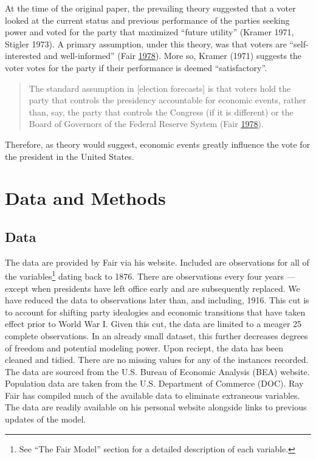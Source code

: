 \documentclass[11,]{article}
\let\rmarkdownfootnote\footnote%
\def\footnote{\protect\rmarkdownfootnote}
\begin{document}
At the time of the original paper, the prevailing theory suggested that
a voter looked at the current status and previous performance of the
parties seeking power and voted for the party that maximized ``future
utility'' (Kramer 1971, Stigler 1973). A primary assumption, under this
theory, was that voters are ``self-interested and well-informed'' (Fair
\protect\hyperlink{ref-fair_effect_1978}{1978}). More so, Kramer (1971)
suggests the voter votes for the party if their performance is deemed
``satisfactory''.

\begin{quote}
The standard assumption in {[}election forecasts{]} is that voters hold
the party that controls the presidency accountable for economic events,
rather than, say, the party that controls the Congress (if it is
different) or the Board of Governors of the Federal Reserve System (Fair
\protect\hyperlink{ref-fair_effect_1978}{1978}).
\end{quote}

Therefore, as theory would suggest, economic events greatly influence
the vote for the president in the United States.

\hypertarget{data-and-methods}{%
\section{Data and Methods}\label{data-and-methods}}

\hypertarget{data}{%
\subsection{Data}\label{data}}

The data are provided by Fair via his website. Included are observations
for all of the variables\footnote{See ``The Fair Model'' section for a
  detailed description of each variable.} dating back to 1876. There are
observations every four years --- except when presidents have left
office early and are subsequently replaced. We have reduced the data to
observations later than, and including, 1916. This cut is to account for
shifting party idealogies and economic transitions that have taken
effect prior to World War I. Given this cut, the data are limited to a
meager 25 complete observations. In an already small dataset, this
further decreases degrees of freedom and potential modeling power. Upon
reciept, the data has been cleaned and tidied. There are no missing
values for any of the instances recorded. The data are sourced from the
U.S. Bureau of Economic Analysis (BEA) website. Population data are
taken from the U.S. Department of Commerce (DOC). Ray Fair has compiled
much of the available data to eliminate extraneous variables. The data
are readily available on his personal website alongside links to
previous updates of the model.
\end{document}
